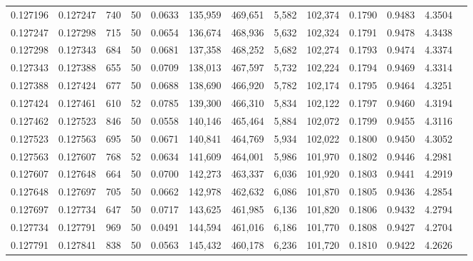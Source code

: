 \begin{tabular}{rrrrrrrrrrrrr}
0.127196 & 0.127247 &   740 &  50 &                                     0.0633 & 135,959 & 469,651 &   5,582 & 102,374 & 0.1790 & 0.9483 & 4.3504 \\
0.127247 & 0.127298 &   715 &  50 &                                     0.0654 & 136,674 & 468,936 &   5,632 & 102,324 & 0.1791 & 0.9478 & 4.3438 \\
0.127298 & 0.127343 &   684 &  50 &                                     0.0681 & 137,358 & 468,252 &   5,682 & 102,274 & 0.1793 & 0.9474 & 4.3374 \\
0.127343 & 0.127388 &   655 &  50 &                                     0.0709 & 138,013 & 467,597 &   5,732 & 102,224 & 0.1794 & 0.9469 & 4.3314 \\
0.127388 & 0.127424 &   677 &  50 &                                     0.0688 & 138,690 & 466,920 &   5,782 & 102,174 & 0.1795 & 0.9464 & 4.3251 \\
0.127424 & 0.127461 &   610 &  52 &                                     0.0785 & 139,300 & 466,310 &   5,834 & 102,122 & 0.1797 & 0.9460 & 4.3194 \\
0.127462 & 0.127523 &   846 &  50 &                                     0.0558 & 140,146 & 465,464 &   5,884 & 102,072 & 0.1799 & 0.9455 & 4.3116 \\
0.127523 & 0.127563 &   695 &  50 &                                     0.0671 & 140,841 & 464,769 &   5,934 & 102,022 & 0.1800 & 0.9450 & 4.3052 \\
0.127563 & 0.127607 &   768 &  52 &                                     0.0634 & 141,609 & 464,001 &   5,986 & 101,970 & 0.1802 & 0.9446 & 4.2981 \\
0.127607 & 0.127648 &   664 &  50 &                                     0.0700 & 142,273 & 463,337 &   6,036 & 101,920 & 0.1803 & 0.9441 & 4.2919 \\
0.127648 & 0.127697 &   705 &  50 &                                     0.0662 & 142,978 & 462,632 &   6,086 & 101,870 & 0.1805 & 0.9436 & 4.2854 \\
0.127697 & 0.127734 &   647 &  50 &                                     0.0717 & 143,625 & 461,985 &   6,136 & 101,820 & 0.1806 & 0.9432 & 4.2794 \\
0.127734 & 0.127791 &   969 &  50 &                                     0.0491 & 144,594 & 461,016 &   6,186 & 101,770 & 0.1808 & 0.9427 & 4.2704 \\
0.127791 & 0.127841 &   838 &  50 &                                     0.0563 & 145,432 & 460,178 &   6,236 & 101,720 & 0.1810 & 0.9422 & 4.2626 \\

\end{tabular}
